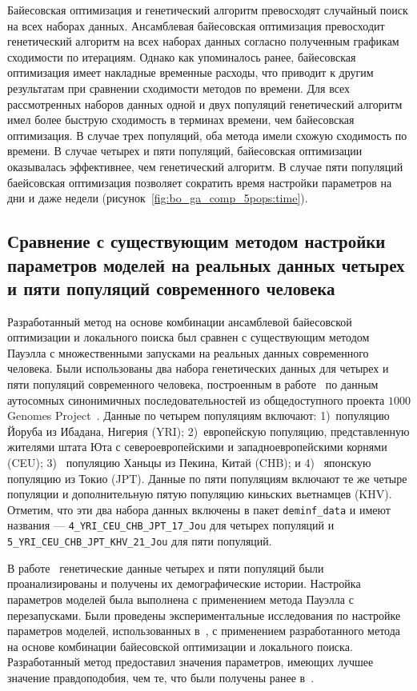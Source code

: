 Байесовская оптимизация и генетический алгоритм превосходят случайный поиск на всех наборах данных.
Ансамблевая байесовская оптимизация превосходит генетический алгоритм на всех наборах данных согласно полученным графикам сходимости по итерациям.
Однако как упоминалось ранее, байесовская оптимизация имеет накладные временные расходы, что приводит к другим результатам при сравнении сходимости методов по времени.
Для всех рассмотренных наборов данных одной и двух популяций генетический алгоритм имел более быструю сходимость в терминах времени, чем байесовская оптимизация.
В случае трех популяций, оба метода имели схожую сходимость по времени.
В случае четырех и пяти популяций, байесовская оптимизации оказывалась эффективнее, чем генетический алгоритм.
В случае пяти популяций баейсовская оптимизация позволяет сократить время настройки параметров на дни и даже недели (рисунок~\ref{fig:bo_ga_comp_5pops:time}).


\FloatBarrier
\subsection{Сравнение с существующим методом настройки параметров моделей на реальных данных четырех и пяти популяций современного человека}
\label{sec:approach:real}

Разработанный метод на основе комбинации ансамблевой байесовской оптимизации и локального поиска был сравнен с существующим методом Пауэлла с множественными запусками на реальных данных современного человека.
Были использованы два набора генетических данных для четырех и пяти популяций современного человека, построенным в работе~\cite{jouganous2017inferring} по данным аутосомных синонимичных последовательностей из общедоступного проекта $1000$ Genomes Project~\cite{sudmant2015integrated, 10002015global}.
Данные по четырем популяциям включают: 1)~популяцию Йоруба из Ибадана, Нигерия (YRI); 2)~европейскую популяцию, представленную жителями штата Юта с североевропейскими и западноевропейскими корнями (CEU); 3)~ популяцию Ханьцы из Пекина, Китай (CHB); и 4)~ японскую популяцию из Токио (JPT). Данные по пяти популяциям включают те же четыре популяции и дополнительную пятую популяцию киньских вьетнамцев (KHV).
Отметим, что эти два набора данных включены в пакет \texttt{deminf\_data} и имеют названия --- \texttt{4\_YRI\_CEU\_CHB\_JPT\_17\_Jou} для четырех популяций и \texttt{5\_YRI\_CEU\_CHB\_JPT\_KHV\_21\_Jou} для пяти популяций.

В работе~\cite{jouganous2017inferring} генетические данные четырех и пяти популяций были проанализированы и получены их демографические истории. 
Настройка параметров моделей была выполнена с применением метода Пауэлла с перезапусками.
Были проведены экспериментальные исследования по настройке параметров моделей, использованных в~\cite{jouganous2017inferring}, с применением разработанного метода на основе комбинации байесовской оптимизации и локального поиска.
Разработанный метод предоставил значения параметров, имеющих лучшее значение правдоподобия, чем те, что были получены ранее в~\cite{jouganous2017inferring}.

